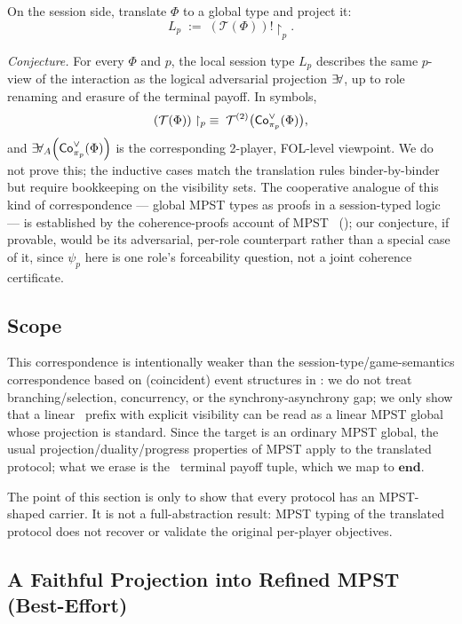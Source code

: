 On the session side, translate $\Phi$ to a global type and project it:
\[
  L_p \;:=\; (\mathcal T(\Phi))!\upharpoonright_p.
\]

\emph{Conjecture.} For every $\Phi$ and $p$,
the local session type $L_p$ describes the same $p$-view of the
interaction as the logical adversarial projection $\mathop{\exists\!\forall}$, up to role
renaming and erasure of the terminal payoff. In symbols,
\[
  (\mathcal T(\Phi)) \upharpoonright_p \;\equiv\;
  \mathcal T^{(2)}\bigl(\mathsf{Co}^{\vee}_{\pi_p}(\Phi)\bigr),
\]
and $\mathop{\exists\!\forall}_{A}\!\left(\mathsf{Co}^{\vee}_{\pi_p}(\Phi)\right)$ is the corresponding 2-player,
FOL-level viewpoint.
We do not prove this; the inductive cases match the translation rules
binder-by-binder but require bookkeeping on the visibility sets. The
cooperative analogue of this kind of correspondence --- global MPST types as
proofs in a session-typed logic --- is established by the coherence-proofs
account of MPST~\cite{CarboneMontesiSchurmannYoshida2015Coherence}
(); our conjecture, if provable, would be its adversarial,
per-role counterpart rather than a special case of it, since $\psi_p$ here is
one role's forceability question, not a joint coherence certificate.

\subsection{Scope}

This correspondence is intentionally weaker than the session-type/game-semantics correspondence based on (coincident) event structures in \cite{CastellanYoshidaSessionGame}: we do not treat branching/selection, concurrency, or the synchrony-asynchrony gap; we only show that a linear \KFOL\ prefix with explicit visibility can be read as a linear MPST global whose projection is standard. Since the target is an ordinary MPST global, the usual projection/duality/progress properties of MPST apply to the translated protocol; what we erase is the \KFOL\ terminal payoff tuple, which we map to $\mathbf{end}$.

The point of this section is only to show that every \KFOL protocol has an MPST-shaped carrier. It is not a full-abstraction result: MPST typing of the translated protocol does not recover or validate the original per-player objectives.

\subsection{A Faithful Projection into Refined MPST (Best-Effort)}
\label{sec:best-effort-rmpst}

